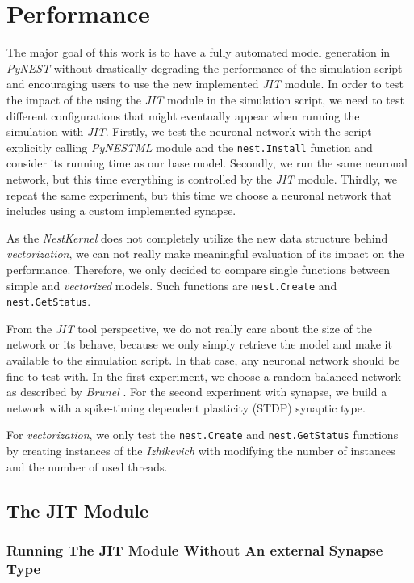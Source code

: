 \chapter{Performance}
 \label{chap:perf}
 
 The major goal of this work is to have a fully automated model generation in \emph{PyNEST} without drastically degrading the performance of the simulation script and encouraging users to use the new implemented \emph{JIT} module. In order to test the impact of the using the \emph{JIT} module in the simulation script, we need to test different configurations that might eventually appear when running the simulation with \emph{JIT}. Firstly, we test the neuronal network with the script explicitly calling \emph{PyNESTML} module and the \texttt{nest.Install} function and  consider its running time as our base model. Secondly, we run the same neuronal network, but this time everything is controlled by the \emph{JIT} module. Thirdly, we repeat the same experiment, but this time we choose a neuronal network that includes using a custom implemented synapse.
 
 As the \emph{NestKernel} does not completely utilize the new data structure behind \emph{vectorization}, we can not really make meaningful evaluation of its impact on the performance. Therefore, we only decided to compare single functions between simple and \emph{vectorized} models. Such functions are \texttt{nest.Create} and \texttt{nest.GetStatus}.
 
 From the \emph{JIT} tool perspective, we do not really care about the size of the network or its behave, because we only simply retrieve the model and make it available to the simulation script. In that case, any neuronal network should be fine to test with. In the first experiment, we choose a random balanced network as  described by \emph{Brunel} \citep{brunel2000dynamics}. For the second experiment with synapse, we build a network with a spike-timing dependent plasticity (STDP) synaptic type.
 
 
 For \emph{vectorization}, we only test the \texttt{nest.Create} and \texttt{nest.GetStatus} functions by creating instances of the \emph{Izhikevich} \citep{1257420} with modifying the number of instances and the number of used threads.
 
\section{The JIT Module}

\subsection*{Running The JIT Module Without An external Synapse Type}

